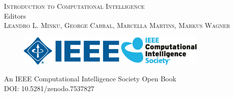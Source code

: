 

\thispagestyle{empty}
\providecommand\pdfbookmark[3][]{} \pdfbookmark[0]{Title Page}{bm:Title}
\vspace*{1cm}
\vfill
\begin{center}
\textsc{\huge{Introduction to Computational Intelligence}}\\
\vfill
Editors\\[\baselineskip]
\textsc{\Large{Leandro L. Minku, George Cabral, Marcella Martins, Markus Wagner}}
\vfill
\end{center}
\begin{figure}[ht!]
\centering
\includegraphics[height=1.5cm]{ieee-logo.png}
\hspace{0.5cm}
\includegraphics[height=1.5cm]{ieee-cis-logo.jpg}
\end{figure}
\begin{center}
An IEEE Computational Intelligence Society Open Book\\
DOI: 10.5281/zenodo.7537827\\[-0.8em]
\end{center}
\clearpage

